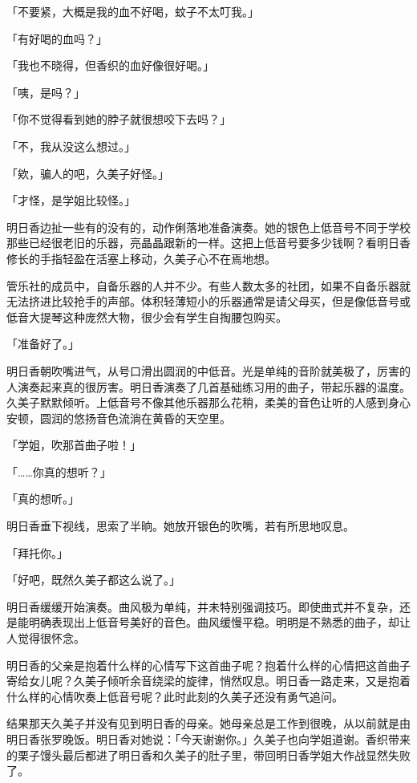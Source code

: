 \documentclass[UTF8]{ctexart}
\begin{document}
    「不要紧，大概是我的血不好喝，蚊子不太叮我。」 

    「有好喝的血吗？」 

    「我也不晓得，但香织的血好像很好喝。」 

    「咦，是吗？」 

    「你不觉得看到她的脖子就很想咬下去吗？」 

    「不，我从没这么想过。」 

    「欸，骗人的吧，久美子好怪。」 

    「才怪，是学姐比较怪。」 

    明日香边扯一些有的没有的，动作俐落地准备演奏。她的银色上低音号不同于学校那些已经很老旧的乐器，亮晶晶跟新的一样。这把上低音号要多少钱啊？看明日香修长的手指轻盈在活塞上移动，久美子心不在焉地想。 

    管乐社的成员中，自备乐器的人并不少。有些人数太多的社团，如果不自备乐器就无法挤进比较抢手的声部。体积轻薄短小的乐器通常是请父母买，但是像低音号或低音大提琴这种庞然大物，很少会有学生自掏腰包购买。 

    「准备好了。」 

    明日香朝吹嘴进气，从号口滑出圆润的中低音。光是单纯的音阶就美极了，厉害的人演奏起来真的很厉害。明日香演奏了几首基础练习用的曲子，带起乐器的温度。久美子默默倾听。上低音号不像其他乐器那么花稍，柔美的音色让听的人感到身心安顿，圆润的悠扬音色流淌在黄昏的天空里。 

    「学姐，吹那首曲子啦！」 

    「……你真的想听？」 

    「真的想听。」 

    明日香垂下视线，思索了半晌。她放开银色的吹嘴，若有所思地叹息。 

    「拜托你。」 

    「好吧，既然久美子都这么说了。」 

    明日香缓缓开始演奏。曲风极为单纯，并未特别强调技巧。即使曲式并不复杂，还是能明确表现出上低音号美好的音色。曲风缓慢平稳。明明是不熟悉的曲子，却让人觉得很怀念。 

    明日香的父亲是抱着什么样的心情写下这首曲子呢？抱着什么样的心情把这首曲子寄给女儿呢？久美子倾听余音绕梁的旋律，悄然叹息。明日香一路走来，又是抱着什么样的心情吹奏上低音号呢？此时此刻的久美子还没有勇气追问。 

    结果那天久美子并没有见到明日香的母亲。她母亲总是工作到很晚，从以前就是由明日香张罗晚饭。明日香对她说：「今天谢谢你。」久美子也向学姐道谢。香织带来的栗子馒头最后都进了明日香和久美子的肚子里，带回明日香学姐大作战显然失败了。 
\end{document}
